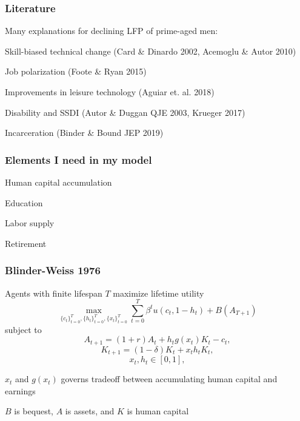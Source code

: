 \documentclass[aspectratio=169]{beamer}
\newenvironment{wideitemize}{\itemize\addtolength{\itemsep}{10pt}}{\enditemize}
\begin{document}
\begin{frame}
    \frametitle{Literature}
    Many explanations for declining LFP of prime-aged men:
    \begin{wideitemize}
        \item Skill-biased technical change (Card \& Dinardo 2002, Acemoglu \& Autor 2010)
        \item Job polarization (Foote \& Ryan 2015)
        \item Improvements in leisure technology (Aguiar et. al. 2018)
        \item Disability and SSDI (Autor \& Duggan QJE 2003, Krueger 2017)
        \item Incarceration (Binder \& Bound JEP 2019)
    \end{wideitemize}
    

\end{frame}

\begin{frame}
    \frametitle{Elements I need in my model}

    \begin{wideitemize}
        \item Human capital accumulation
        \item Education
        \item Labor supply
        \item Retirement
    \end{wideitemize}

\end{frame}

\begin{frame}
    \frametitle{Blinder-Weiss 1976}
    Agents with finite lifespan $T$ maximize lifetime utility
    \begin{equation*}
        \max_{\{ c_t \}_{t=0}^T, \{ h_t \}_{t=0}^T, \{ x_t \}_{t=0}^T} \sum_{t=0}^{T} \beta^t u(c_t, 1-h_t) + B(A_{T+1})
    \end{equation*}
    subject to
    \begin{equation*}
        A_{t+1} = (1+r)A_{t} + h_t g(x_t)K_{t} - c_{t},
    \end{equation*}
    \begin{equation*}
        K_{t+1} = (1-\delta)K_t + x_t h_t K_t,
    \end{equation*}
    \begin{equation*}
        x_t ,h_t \in [0,1],
    \end{equation*}
    \begin{wideitemize}
        \item $x_t$ and $g(x_t)$ governs tradeoff between accumulating human capital and earnings
        \item $B$ is bequest, $A$ is assets, and $K$ is human capital
    \end{wideitemize}

\end{frame}
\end{document}
